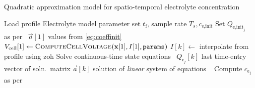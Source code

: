 
\begin{algorithm}[!htbp]
    \caption{Quadratic approximation model for spatio-temporal electrolyte concentration}\label{alg:quadraticce}
    \begin{algorithmic}[1]
        \Require Load profile 
        \Require Electrolyte model parameter set  
        \Userdata $ t_\text{f}$,  sample rate $T_s, c_\text{e,init}$
        \State Set $Q_{\text{e,init}_j}$ as per~
        \State $\vec{a}[1]$ \gets values from \cref{eq:coeffinit}
        \State $V_\text{cell}[1] \gets \textsc{ComputeCellVoltage}(\textbf{x}[1],I[1],\texttt{params})$ 
        \State $I[k] \gets $ interpolate from profile using \gls{zoh}
        \State Solve continuous-time state equations~ 
        \State $Q_{\text{e}_j}[k]$ \gets last time-entry  vector of soln.\  matrix 
        \State $\vec{a}[k]$ \gets solution of \emph{linear} system of equations ~ 
        \State Compute $c_{\text{e}_j}$ as per~ 
        \EndFor
        \EndFunction
    \end{algorithmic}
\end{algorithm}
